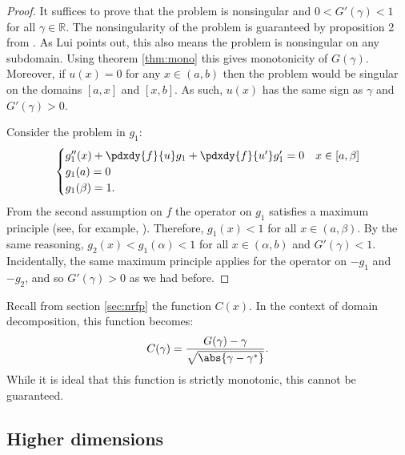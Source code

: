 \documentclass{article}
\begin{document}
\begin{proof}
It suffices to prove that the problem is nonsingular and $0 < G'(\gamma) < 1$ for all $\gamma \in \mathbb{R}$.
The nonsingularity of the problem is guaranteed by proposition 2 from \cite{lui1999schwarz}.
As Lui points out, this also means the problem is nonsingular on any subdomain.
Using theorem \ref{thm:mono} this gives monotonicity of $G(\gamma)$.
Moreover, if $u(x)=0$ for any $x \in (a,b)$ then the problem would be singular on the domains $[a,x]$ and $[x,b]$.
As such, $u(x)$ has the same sign as $\gamma$ and $G'(\gamma) > 0$.

Consider the problem in $g_1$:
\begin{equation*}
\begin{cases} g_1''(x) + \pdxdy{f}{u} g_1 + \pdxdy{f}{u'} g_1' = 0 & x \in [a,\beta] \\ g_1(a) = 0 \\ g_1(\beta) = 1 . \end{cases}
\end{equation*}
From the second assumption on $f$ the operator on $g_1$ satisfies a maximum principle (see, for example, \cite{lui1999schwarz}).
Therefore, $g_1(x) < 1$ for all $x \in (a,\beta)$.
By the same reasoning, $g_2(x) < g_1(\alpha) < 1$ for all $x \in (\alpha, b)$ and $G'(\gamma) < 1$.
Incidentally, the same maximum principle applies for the operator on $-g_1$ and $-g_2$, and so $G'(\gamma) > 0$ as we had before.
\end{proof}

Recall from section \ref{sec:nrfp} the function $C(x)$.
In the context of domain decomposition, this function becomes:
\begin{equation*}
C(\gamma) = \frac{ G(\gamma) - \gamma}{\sqrt{\abs{\gamma - \gamma^*}}} .
\end{equation*}
While it is ideal that this function is strictly monotonic, this cannot be guaranteed.

\subsection{Higher dimensions}
\end{document}

